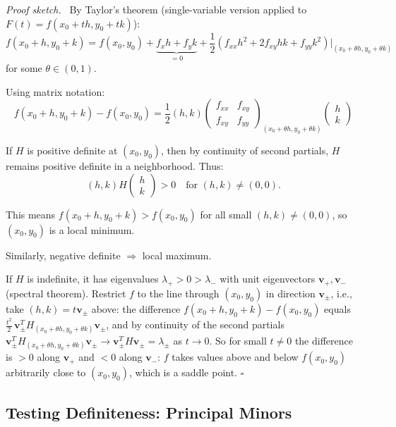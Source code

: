 \documentclass[11pt]{report}
\renewenvironment{proof}[1][Proof]{\par\noindent\textit{#1.}\ }{\hfill$\square$\par\medskip}
\begin{document}
\begin{proof}[Proof sketch]
By Taylor's theorem (single-variable version applied to $F(t) = f(x_0 + th, y_0 + tk)$):
\[
f(x_0 + h, y_0 + k) = f(x_0, y_0) + \underbrace{f_x h + f_y k}_{= 0} + \frac{1}{2}\left( f_{xx} h^2 + 2f_{xy} hk + f_{yy} k^2 \right)\Big|_{(x_0 + \theta h, y_0 + \theta k)}
\]
for some $\theta \in (0, 1)$.

Using matrix notation:
\[
f(x_0 + h, y_0 + k) - f(x_0, y_0) = \frac{1}{2} (h, k) \begin{pmatrix} f_{xx} & f_{xy} \\ f_{xy} & f_{yy} \end{pmatrix}_{(x_0 + \theta h, y_0 + \theta k)} \begin{pmatrix} h \\ k \end{pmatrix}
\]

If $H$ is positive definite at $(x_0, y_0)$, then by continuity of second partials, $H$ remains positive definite in a neighborhood. Thus:
\[
(h, k) H \begin{pmatrix} h \\ k \end{pmatrix} > 0 \quad \text{for } (h, k) \neq (0, 0).
\]

This means $f(x_0 + h, y_0 + k) > f(x_0, y_0)$ for all small $(h, k) \neq (0, 0)$, so $(x_0, y_0)$ is a local minimum.

Similarly, negative definite $\Rightarrow$ local maximum.

If $H$ is indefinite, it has eigenvalues $\lambda_+ > 0 > \lambda_-$ with unit eigenvectors $\mathbf{v}_+, \mathbf{v}_-$ (spectral theorem). Restrict $f$ to the line through $(x_0, y_0)$ in direction $\mathbf{v}_\pm$, i.e., take $(h, k) = t\mathbf{v}_\pm$ above: the difference $f(x_0 + h, y_0 + k) - f(x_0, y_0)$ equals $\frac{t^2}{2}\,\mathbf{v}_\pm^{T} H_{(x_0 + \theta h, y_0 + \theta k)} \mathbf{v}_\pm$, and by continuity of the second partials $\mathbf{v}_\pm^{T} H_{(x_0 + \theta h, y_0 + \theta k)} \mathbf{v}_\pm \to \mathbf{v}_\pm^{T} H \mathbf{v}_\pm = \lambda_\pm$ as $t \to 0$. So for small $t \neq 0$ the difference is $> 0$ along $\mathbf{v}_+$ and $< 0$ along $\mathbf{v}_-$: $f$ takes values above and below $f(x_0, y_0)$ arbitrarily close to $(x_0, y_0)$, which is a saddle point.
\end{proof}

\subsection*{Testing Definiteness: Principal Minors}
\end{document}
